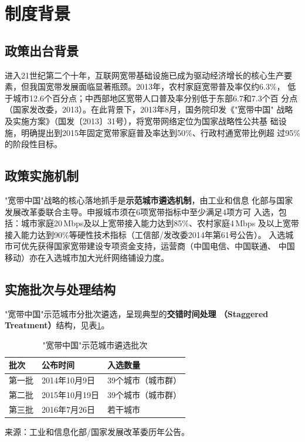 \documentclass[12pt, a4paper]{article}
\begin{document}
\section{制度背景}

\subsection{政策出台背景}

进入21世纪第二个十年，互联网宽带基础设施已成为驱动经济增长的核心生产要
素，但我国宽带发展面临显著瓶颈。2013年，农村家庭宽带普及率仅约6.3\%，
低于城市12.6个百分点；中西部地区宽带人口普及率分别低于东部6.7和7.3个百
分点（国家发改委，2013）。在此背景下，2013年8月，国务院印发《"宽带中国"
战略及实施方案》（国发〔2013〕31号），将宽带网络定位为国家战略性公共基
础设施，明确提出到2015年固定宽带家庭普及率达到50\%、行政村通宽带比例超
过95\%的阶段性目标。

\subsection{政策实施机制}

"宽带中国"战略的核心落地抓手是\textbf{示范城市遴选机制}，由工业和信息
化部与国家发展改革委联合主导。申报城市须在6项宽带指标中至少满足4项方可
入选，包括：城市家庭20\,Mbps及以上宽带接入能力达到85\%、农村家庭4\,Mbps
及以上宽带接入能力达到90\%等硬性技术指标（工信部/发改委2014年第61号公告）。
入选城市可优先获得国家宽带建设专项资金支持，运营商（中国电信、中国联通、
中国移动）亦在入选城市加大光纤网络铺设力度。

\subsection{实施批次与处理结构}

"宽带中国"示范城市分批次遴选，呈现典型的\textbf{交错时间处理
（Staggered Treatment）}结构，见表\ref{tab:batch}。

\begin{table}[h]
\centering
\caption{"宽带中国"示范城市遴选批次}
\label{tab:batch}
\begin{threeparttable}
\begin{tabular}{lll}
\toprule
批次 & 公布时间 & 入选数量 \\
\midrule
第一批 & 2014年10月9日 & 39个城市（城市群） \\
第二批 & 2015年10月19日 & 39个城市（城市群） \\
第三批 & 2016年7月26日 & 若干城市 \\
\bottomrule
\end{tabular}
\begin{tablenotes}\small
\item 来源：工业和信息化部/国家发展改革委历年公告。
\end{tablenotes}
\end{threeparttable}
\end{table}
\end{document}
